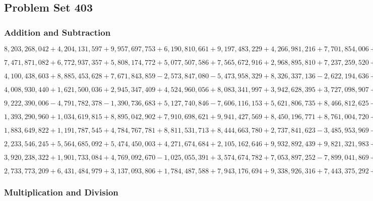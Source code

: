 \hypertarget{problem-set-403}{%
\subsection{Problem Set 403}\label{problem-set-403}}

\hypertarget{addition-and-subtraction}{%
\subsubsection{Addition and
Subtraction}\label{addition-and-subtraction}}

\(8,203,268,042+4,204,131,597+9,957,697,753+6,190,810,661+9,197,483,229+4,266,981,216+7,701,854,006+5,010,356,896+3,926,405,230+8,296,672,920\)

\(7,471,871,082+6,772,937,357+5,808,174,772+5,077,507,586+7,565,672,916+2,968,895,810+7,237,259,520+4,836,022,965+1,401,059,399+3,838,493,097\)

\(4,100,438,603+8,885,453,628+7,671,843,859-2,573,847,080-5,473,958,329+8,326,337,136-2,622,194,636+4,700,442,517+1,595,554,898-3,691,827,197\)

\(4,008,930,440+1,621,500,036+2,945,347,409+4,524,960,056+8,083,341,997+3,942,628,395+3,727,098,907+9,150,202,089+1,021,825,831+9,731,110,359\)

\(9,222,390,006-4,791,782,378-1,390,736,683+5,127,740,846-7,606,116,153+5,621,806,735+8,466,812,625-3,333,525,934+7,704,334,011+1,755,139,867\)

\(1,393,290,960+1,034,619,815+8,895,042,902+7,910,698,621+9,941,427,569+8,450,196,771+8,761,004,720+9,417,502,851+5,313,490,779+6,993,442,237\)

\(1,883,649,822+1,191,787,545+4,784,767,781+8,811,531,713+8,444,663,780+2,737,841,623-3,485,953,969-2,189,202,803-5,186,810,018-5,926,104,627\)

\(2,233,546,245+5,564,685,092+5,474,450,003+4,271,674,684+2,105,162,646+9,932,892,439+9,821,321,983+1,204,796,026+1,788,777,417+4,778,299,562\)

\(3,920,238,322+1,901,733,084+4,769,092,670-1,025,055,391+3,574,674,782+7,053,897,252-7,899,041,869+6,631,261,589-1,163,857,479-7,273,211,936\)

\(2,733,773,209+6,431,484,979+3,137,093,806+1,784,487,588+7,943,176,694+9,338,926,316+7,443,375,292+1,503,482,394+5,701,263,594+1,632,394,730\)

\hypertarget{multiplication-and-division}{%
\subsubsection{Multiplication and
Division}\label{multiplication-and-division}}

